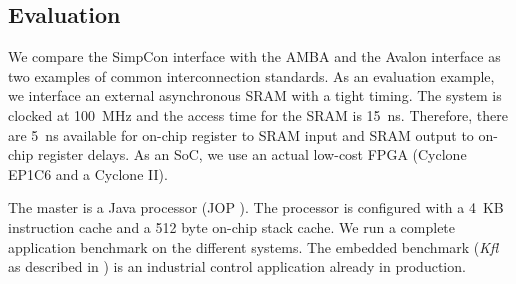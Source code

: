\subsection{Evaluation}

We compare the SimpCon interface with the AMBA and the Avalon
interface as two examples of common interconnection standards. As an
evaluation example, we interface an external asynchronous SRAM with a
tight timing. The system is clocked at 100~MHz and the access time
for the SRAM is 15~ns. Therefore, there are 5~ns available for
on-chip register to SRAM input and SRAM output to on-chip register
delays. As an SoC, we use an actual low-cost FPGA (Cyclone EP1C6
\cite{AltCyc} and a Cyclone II).

The master is a Java processor (JOP \cite{jop:thesis,
jop:jnl:jsa2007}). The processor is configured with a 4~KB
instruction cache and a 512 byte on-chip stack cache. We run a
complete application benchmark on the different systems. The embedded
benchmark (\emph{Kfl} as described in \cite{jop:austrochip05}) is an
industrial control application already in production.



